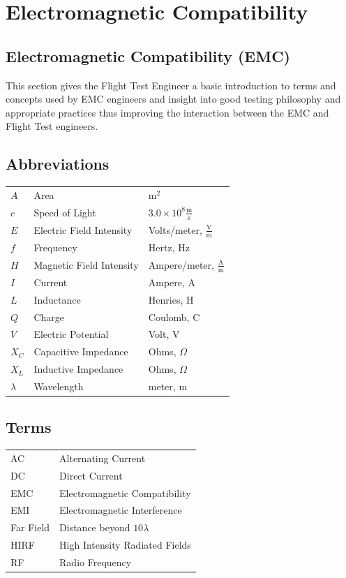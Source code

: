 \documentclass[
]{book}
\begin{document}
\hypertarget{electromagnetic-compatibility}{%
\chapter{Electromagnetic Compatibility}\label{electromagnetic-compatibility}}

\hypertarget{electromagnetic-compatibility-emc}{%
\section{Electromagnetic Compatibility (EMC)}\label{electromagnetic-compatibility-emc}}

This section gives the Flight Test Engineer a basic introduction to terms and
concepts used by EMC engineers and insight into good testing philosophy and
appropriate practices thus improving the interaction between the EMC and Flight
Test engineers.

\hypertarget{abbreviations}{%
\section{Abbreviations}\label{abbreviations}}

\begin{longtable}[]{@{}lll@{}}
\toprule
\endhead
\(A\) & Area & \(\text{m}^2\)\tabularnewline
\(c\) & Speed of Light & \(3.0\times 10^8 \frac{\text{m}}{\text{s}}\)\tabularnewline
\(E\) & Electric Field Intensity & Volts/meter, \(\frac{\text{V}}{\text{m}}\)\tabularnewline
\(f\) & Frequency & Hertz, \(\text{Hz}\)\tabularnewline
\(H\) & Magnetic Field Intensity & Ampere/meter, \(\frac{\text{A}}{\text{m}}\)\tabularnewline
\(I\) & Current & Ampere, \(\text{A}\)\tabularnewline
\(L\) & Inductance & Henries, \(\text{H}\)\tabularnewline
\(Q\) & Charge & Coulomb, \(\text{C}\)\tabularnewline
\(V\) & Electric Potential & Volt, \(\text{V}\)\tabularnewline
\(X_C\) & Capacitive Impedance & Ohms, \(\Omega\)\tabularnewline
\(X_L\) & Inductive Impedance & Ohms, \(\Omega\)\tabularnewline
\(\lambda\) & Wavelength & meter, \(\text{m}\)\tabularnewline
\bottomrule
\end{longtable}

\hypertarget{terms}{%
\section{Terms}\label{terms}}

\begin{longtable}[]{@{}ll@{}}
\toprule
\endhead
AC & Alternating Current\tabularnewline
DC & Direct Current\tabularnewline
EMC & Electromagnetic Compatibility\tabularnewline
EMI & Electromagnetic Interference\tabularnewline
Far Field & Distance beyond \(10 \lambda\)\tabularnewline
HIRF & High Intensity Radiated Fields\tabularnewline
RF & Radio Frequency\tabularnewline
\bottomrule
\end{longtable}
\end{document}
